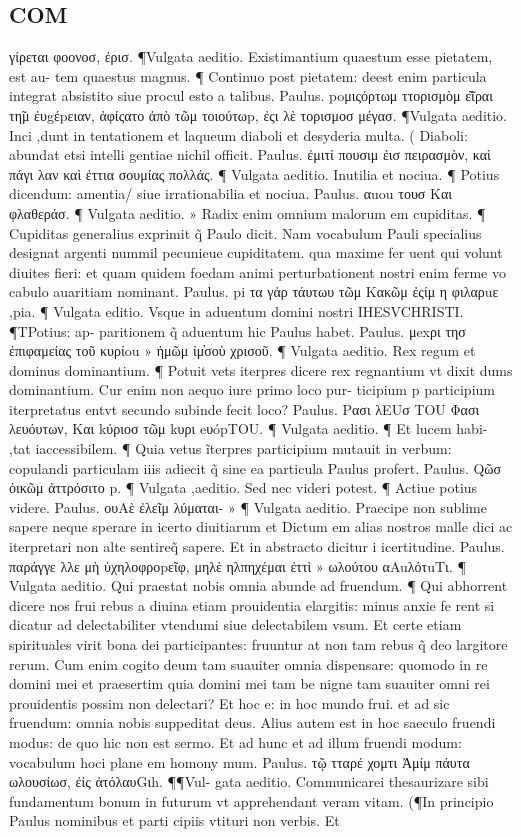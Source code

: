 \documentclass{article}
\begin{document}
\begin{pages}
\section*{COM }
\marginpar{[ p.6 ]}\pstart  γίρεται φοονοσ, ἐρισ. ¶Vulgata aeditio. Existimantium quaestum esse pietatem, est au-  tem quaestus magnus. ¶ Continuo post pietatem: deest enim particula integrat absistito siue procul esto a talibus. Paulus. poμιςόρτωμ ττορισμὸμ ε̃͂ιραι τη̃μ ἐυgέpειαν, ἀφίςατο ἀπὸ τῶμ τοιούτωp, ἐςι λὲ τορισμοσ μέγασ. ¶Vulgata aeditio. Inci ,dunt in tentationem et laqueum diaboli et desyderia multa. ( Diaboli: abundat etsi intelli gentiae nichil officit. Paulus. ἐμιτί πουσιμ ἐισ πειρασμὸν, καὶ πάγι λαν καὶ ἐττια σουμίας πολλάς. ¶ Vulgata aeditio. Inutilia et nociua. ¶ Potius dicendum: amentia/  siue irrationabilia et nociua. Paulus. αuou τουσ Και φλαθεράσ. ¶ Vulgata aeditio. » Radix enim omnium malorum em cupiditas. ¶ Cupiditas generalius exprimit q̃ Paulo dicit. Nam vocabulum Pauli specialius designat argenti nummil pecunieue cupiditatem. qua maxime fer uent qui volunt diuites fieri: et quam quidem foedam animi perturbationent nostri enim ferme vo cabulo auaritiam nominant. Paulus. pi τα γἀρ τάυτωυ τῶμ Κακῶμ ἐςίμ η φιλαρuε ,pia. ¶ Vulgata editio. Vsque in aduentum domini nostri IHESVCHRISTI. ¶TPotius: ap- paritionem q̃ aduentum hic Paulus habet. Paulus. μexρι τησ ἐπιφαμείας τοῦ κυρίou » ἡμῶμ ἰμ̓σοὺ χρισοῦ. ¶ Vulgata aeditio. Rex regum et dominus dominantium. ¶ Potuit vets iterpres dicere rex regnantium vt dixit dums dominantium. Cur enim non aequo iure primo loco pur- ticipium p participium iterpretatus entvt secundo subinde fecit loco? Paulus. Pασι λEUσ TOU  Φασι λευόυτων, Και kύριοσ τῶμ kυρι eυópTOU. ¶ Vulgata aeditio. ¶ Et lucem habi- ,tat iaccessibilem. ¶ Quia vetus ĩterpres participium mutauit in verbum: copulandi particulam iiis adiecit q̃ sine ea particula Paulus profert. Paulus. Qῶσ ὀικῶμ ἀττρόσιτο p. ¶ Vulgata ,aeditio. Sed nec videri potest. ¶ Actiue potius videre. Paulus. ουAὲ ἐλεῖμ λύμαται- » ¶ Vulgata aeditio. Praecipe non sublime sapere neque sperare in icerto diuitiarum et Dictum em alias nostros malle dici ac iterpretari non alte sentireq̃ sapere. Et in abstracto dicitur i icertitudine. Paulus. παράγγε λλε μὴ ὐχηλοφροpεῖφ, μηλὲ ηλπηχέμαι ἐττὶ » ωλούτου αAuλότuTι. ¶ Vulgata aeditio. Qui praestat nobis omnia abunde ad fruendum. ¶ Qui abhorrent dicere nos frui rebus a diuina etiam prouidentia elargitis: minus anxie fe rent si dicatur ad delectabiliter vtendumi siue delectabilem vsum. Et certe etiam spirituales virit bona dei participantes: fruuntur at non tam rebus q̃ deo largitore rerum. Cum enim cogito deum tam suauiter omnia dispensare: quomodo in re domini mei et praesertim quia domini mei tam be nigne tam suauiter omni rei prouidentis possim non delectari? Et hoc e: in hoc mundo frui. et ad sic fruendum: omnia nobis suppeditat deus. Alius autem est in hoc saeculo fruendi modus: de quo hic non est sermo. Et ad hunc et ad illum fruendi modum: vocabulum hoci plane em homony mum. Paulus. τῷ τταρέ χομτι Ἀμίμ πάυτα ωλουσίωσ, ἐἰς ἀτόλαυGιh. ¶¶Vul- gata aeditio. Communicarei thesaurizare sibi fundamentum bonum in futurum vt apprehendant veram vitam. (¶In principio Paulus nominibus et parti cipiis vtituri non verbis. Et 
\end{pages}
\end{document}
